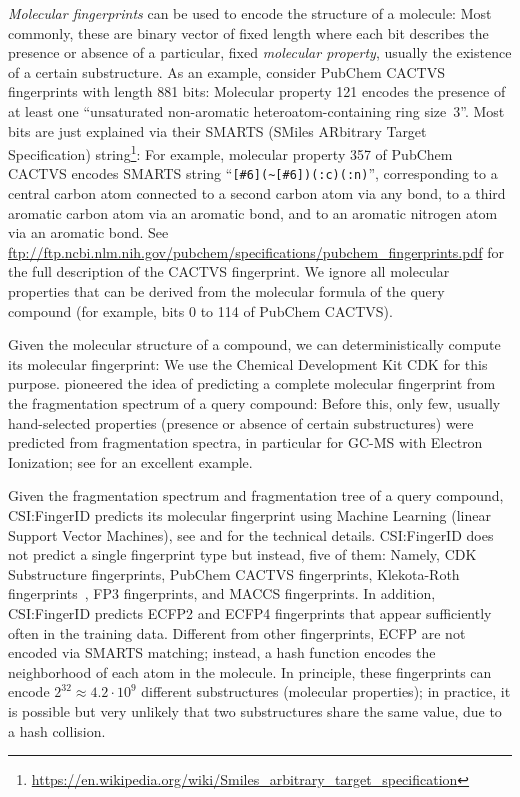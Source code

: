 \documentclass[letterpaper,10pt,openany,oneside]{sphinxmanual}
\begin{document}
\emph{Molecular fingerprints} can be used to encode the structure of a
molecule: Most commonly, these are binary vector of fixed length where each
bit describes the presence or absence of a particular, fixed \emph{molecular
property}, usually the existence of a certain substructure.  As an example,
consider PubChem CACTVS fingerprints with length 881 bits: Molecular property
121 encodes the presence of at least one ``unsaturated non-aromatic
heteroatom-containing ring size~3''.  Most bits are just explained via their
SMARTS (SMiles ARbitrary Target Specification)
string\footnote{\sphinxAtStartFootnote%
\url{https://en.wikipedia.org/wiki/Smiles_arbitrary_target_specification}}:
For example, molecular property 357 of PubChem CACTVS encodes SMARTS string
``\verb=[#6](~[#6])(:c)(:n)='', corresponding to a central carbon atom
connected to a second carbon atom via any bond, to a third aromatic carbon
atom via an aromatic bond, and to an aromatic nitrogen atom via an aromatic
bond.
See \url{ftp://ftp.ncbi.nlm.nih.gov/pubchem/specifications/pubchem_fingerprints.pdf}
for the full description of the CACTVS fingerprint. We ignore all molecular
properties that can be derived from the molecular formula of the query
compound (for example, bits 0 to 114 of PubChem CACTVS).

Given the molecular structure of a compound, we can deterministically compute
its molecular fingerprint: We use the Chemical Development Kit CDK
\citep{steinbeck03chemistry, steinbeck06recent, willighagen17chemistry} for
this purpose.  \citet{heinonen12metabolite} pioneered the idea of predicting
a complete molecular fingerprint from the fragmentation spectrum of a query
compound: Before this, only few, usually hand-selected properties (presence
or absence of certain substructures) were predicted from fragmentation
spectra, in particular for GC-MS with Electron Ionization;
see \citet{curry90msnet} for an excellent example.

Given the fragmentation spectrum and fragmentation tree of a query compound,
CSI:FingerID predicts its molecular fingerprint using Machine Learning
(linear Support Vector Machines), see \citet{shen14metabolite}
and \citet{duehrkop15searching} for the technical details.  CSI:FingerID does
not predict a single fingerprint type but instead, five of them: Namely, CDK
Substructure fingerprints, PubChem CACTVS fingerprints, Klekota-Roth
fingerprints~\citep{klekota08chemical}, FP3 fingerprints, and MACCS
fingerprints.  In addition, CSI:FingerID predicts ECFP2 and ECFP4 fingerprints
\citep{rogers10extended} that appear sufficiently often in the training data.
Different from other fingerprints, ECFP are not encoded via SMARTS matching;
instead, a hash function encodes the neighborhood of each atom in the
molecule.  In principle, these fingerprints can encode $2^{32} \approx
4.2 \cdot 10^9$ different substructures (molecular properties); in practice,
it is possible but very unlikely that two substructures share the same value,
due to a hash collision.
\end{document}
